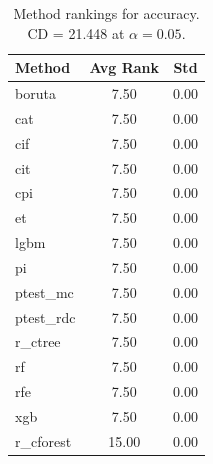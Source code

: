 \begin{table}[h]
\centering
\caption{Method rankings for accuracy. CD = 21.448 at $\alpha=0.05$.}
\label{tab:ranks_accuracy}
\begin{tabular}{lcc}
\toprule
Method & Avg Rank & Std \\
\midrule
boruta & 7.50 & 0.00 \\
cat & 7.50 & 0.00 \\
cif & 7.50 & 0.00 \\
cit & 7.50 & 0.00 \\
cpi & 7.50 & 0.00 \\
et & 7.50 & 0.00 \\
lgbm & 7.50 & 0.00 \\
pi & 7.50 & 0.00 \\
ptest_mc & 7.50 & 0.00 \\
ptest_rdc & 7.50 & 0.00 \\
r_ctree & 7.50 & 0.00 \\
rf & 7.50 & 0.00 \\
rfe & 7.50 & 0.00 \\
xgb & 7.50 & 0.00 \\
r_cforest & 15.00 & 0.00 \\
\bottomrule
\end{tabular}
\end{table}